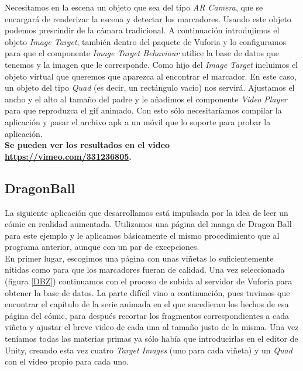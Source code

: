 Necesitamos en la escena un objeto que sea del tipo \textit{AR Camera}, que se encargará de renderizar la escena y detectar los marcadores. Usando este objeto podemos prescindir de la cámara tradicional. A continuación introdujimos el objeto \textit{Image Target}, también dentro del paquete de Vuforia y lo configuramos para que el componente \textit{Image Target Behaviour} utilice la base de datos que tenemos y la imagen que le corresponde. Como hijo del \textit{Image Target} incluimos el objeto virtual que queremos que aparezca al encontrar el marcador. En este caso, un objeto del tipo \textit{Quad} (es decir, un rectángulo vacío) nos servirá. Ajustamos el ancho y el alto al tamaño del padre y le añadimos el componente \textit{Video Player} para que reproduzca el gif animado. Con esto sólo necesitaríamos compilar la aplicación y pasar el archivo apk a un móvil que lo soporte para probar la aplicación.\\

\textbf{Se pueden ver los resultados en el video \url{https://vimeo.com/331236805}.}

\subsection{DragonBall}
La siguiente aplicación que desarrollamos está impulsada por la idea de leer un cómic en realidad aumentada. Utilizamos una página del manga de Dragon Ball para este ejemplo y le aplicamos básicamente el mismo procedimiento que al programa anterior, aunque con un par de excepciones.\\

En primer lugar, escogimos una página con unas viñetas lo suficientemente nítidas como para que los marcadores fueran de calidad. Una vez seleccionada (figura \ref{DBZ}) continuamos con el proceso de subida al servidor de Vuforia para obtener la base de datos. La parte difícil vino a continuación, pues tuvimos que encontrar el capítulo de la serie animada en el que sucedieran los hechos de esa página del cómic, para después recortar los fragmentos correspondientes a cada viñeta y ajustar el breve video de cada una al tamaño justo de la misma. Una vez teníamos todas las materias primas ya sólo había que introducirlas en el editor de Unity, creando esta vez cuatro \textit{Target Images} (uno para cada viñeta) y un \textit{Quad} con el video propio para cada uno.\\

